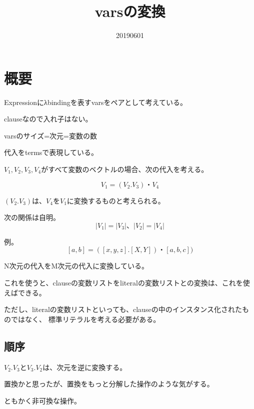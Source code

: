 \documentclass[10pt, onecolumn]{jarticle}   	%
\title{varsの変換}
\author{\myname}
\date{20190601}					%
\begin{document}
\maketitle

\section{概要}
Expressionにλbindingを表すvarsをペアとして考えている。

clauseなので入れ子はない。

varsのサイズ=次元=変数の数

代入をtermsで表現している。


$V_1,V_2,V_3,V_4$がすべて変数のベクトルの場合、次の代入を考える。

$$V_1 = (V_2.V_3)・V_4$$

$(V_2.V_3)$は、$V_4$を$V_1$に変換するものと考えられる。

次の関係は自明。
$$|V_1| = |V_3|、|V_2| = |V_4|$$

例。
$$[a,b] = ([x,y,z].[X,Y])・ [a,b,c])$$

N次元の代入をM次元の代入に変換している。

これを使うと、clauseの変数リストをliteralの変数リストとの変換は、これを使えばできる。


ただし、literalの変数リストといっても、clauseの中のインスタンス化されたものではなく、
標準リテラルを考える必要がある。

\subsection{順序}
$V_2.V_3$と$V_3.V_2$は、次元を逆に変換する。

置換かと思ったが、置換をもっと分解した操作のような気がする。

ともかく非可換な操作。



%
\end{document}
